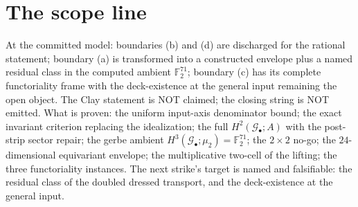 \documentclass[11pt]{article}
\newcommand{\Gbul}{\mathcal{G}_\bullet}
\newcommand{\F}{\mathbb{F}}
\newcommand{\mud}{\mu_2}
\begin{document}
\section{The scope line}

At the committed model: boundaries (b) and (d) are discharged for the
rational statement; boundary (a) is transformed into a constructed
envelope plus a named residual class in the computed ambient
$\F_2^{71}$; boundary (c) has its complete functoriality frame with
the deck-existence at the general input remaining the open object.
The Clay statement is NOT claimed; the closing string is NOT emitted.
What is proven: the uniform input-axis denominator bound; the exact
invariant criterion replacing the idealization; the full
$H^2(\Gbul;A)$ with the post-strip sector repair; the gerbe ambient
$H^3(\Gbul;\mud)=\F_2^{71}$; the $2\times2$ no-go; the $24$-dimensional
equivariant envelope; the multiplicative two-cell of the lifting; the
three functoriality instances. The next strike's target is named and
falsifiable: the residual class of the doubled dressed transport, and
the deck-existence at the general input.
\end{document}
